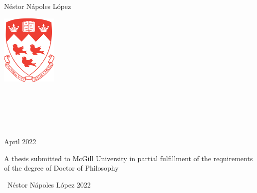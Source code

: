 \begin{titlepage}
\begin{center}

    \huge
    \textbf{}


    \vspace{1cm}

    \LARGE N\'estor N\'apoles L\'opez

    \vspace{1cm}

    \includegraphics[width=0.2\textwidth]{frontmatter/figures/mcgill}

    \vspace{0.5cm}

    \large
     \\
     \\
     \\
     \\

    \vfill

    April 2022

    \vspace{2cm}

    A thesis submitted to McGill University in partial
    fulfillment of the requirements of the degree of Doctor
    of Philosophy

    \vspace{1cm}

    \textcopyright \ N\'estor N\'apoles L\'opez 2022

\end{center}
\end{titlepage}
